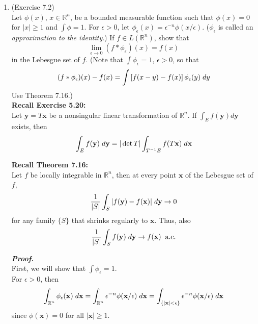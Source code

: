 \documentclass[a4paper,11pt]{article}
\begin{document}
\begin{enumerate}
 	\item (Exercise 7.2)\\
 		Let $\phi (x)$, $x \in \mathbb{R}^n$, be a bounded measurable function such that $\phi (x) = 0$ for $|x| \geq 1$ and $\int \phi = 1$. For $\epsilon > 0$, let  $\phi_{\epsilon} (x) = \epsilon^{-n} \phi (x/\epsilon)$. ($\phi_\epsilon$ is called an \textit{approximation to the identity}.) If $f \in L(\mathbb{R}^n)$, show that
 		$$\underset{\epsilon \to 0}{\lim} (f * \phi_\epsilon ) (x) = f(x)$$
 		in the Lebesgue set of $f$. (Note that $\int \phi_\epsilon = 1$, $\epsilon > 0$, so that
 		$$(f * \phi_\epsilon) (x) - f(x) = \int \left[ f(x-y) - f(x) \right] \phi_\epsilon (y) \hspace{0.1cm} dy$$
 		Use Theorem 7.16.)\\

 		\textbf{Recall Exercise 5.20:}\\
 		Let $\mathbf{y} = T \mathbf{x}$ be a nonsingular linear transformation of $\mathbb{R}^n$. If $\int_E f(\mathbf{y}) d \mathbf{y}$ exists, then
 		$$\int_E f(\mathbf{y}) \hspace{0.1cm} d\mathbf{y}
 		= |\det T| \int_{T^{-1}E} f(T \mathbf{x}) \hspace{0.1cm} d \mathbf{x}$$
 	
 		\textbf{Recall Theorem 7.16:}\\
 		Let $f$ be locally integrable in $\mathbb{R}^n$, then at every point $\mathbf{x}$ of the Lebesgue set of $f$,
 		$$\frac{1}{|S|} \int_S |f(\mathbf{y}) - f(\mathbf{x})| \hspace{0.1cm} d \mathbf{y} \to 0$$
 		for any family $\{ S \}$ that shrinks regularly to $\mathbf{x}$. Thus, also
 		$$\frac{1}{|S|} \int_S f(\mathbf{y}) \hspace{0.1cm} d \mathbf{y} \to f(\mathbf{x}) \hspace{0.2cm} \mbox{a.e.}$$

 		\textit{\textbf {Proof.}}\\

 		First, we will show that $\int \phi_\epsilon = 1$.\\
 		For $\epsilon > 0$, then
 		$$\int_{\mathbb{R}^n} \phi_\epsilon(\mathbf{x}) \hspace{0.1cm} d\mathbf{x}
 		= \int_{\mathbb{R}^n} \epsilon^{-n} \phi(\mathbf{x}/\epsilon) \hspace{0.1cm} d\mathbf{x}
 		= \int_{\{ |\mathbf{x}| < \epsilon \}} \epsilon^{-n} \phi(\mathbf{x}/\epsilon) \hspace{0.1cm} d\mathbf{x}$$
 		since $\phi(\mathbf{x}) = 0$ for all $|\mathbf{x}| \geq 1$.\\


\end{enumerate}
\end{document}
